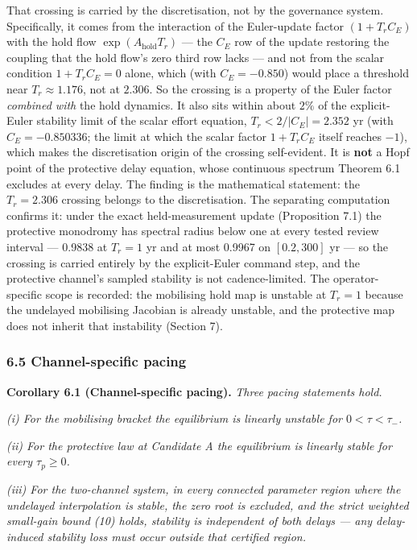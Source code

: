 \documentclass[11pt]{article}
\begin{document}
That crossing is carried by the discretisation, not by the governance
system. Specifically, it comes from the interaction of the Euler-update
factor \((1 + T_r C_E)\) with the hold flow
\(\exp(A_{\mathrm{hold}}T_r)\) --- the \(C_E\) row of the update
restoring the coupling that the hold flow's zero third row lacks --- and
not from the scalar condition \(1 + T_r C_E = 0\) alone, which (with
\(C_E = -0.850\)) would place a threshold near \(T_r \approx 1.176\),
not at \(2.306\). So the crossing is a property of the Euler factor
\emph{combined with} the hold dynamics. It also sits within about
\(2\%\) of the explicit-Euler stability limit of the scalar effort
equation, \(T_r < 2/|C_E| = 2.352\) yr (with \(C_E = -0.850336\); the
limit at which the scalar factor \(1 + T_r C_E\) itself reaches \(-1\)),
which makes the discretisation origin of the crossing self-evident. It
is \textbf{not} a Hopf point of the protective delay equation, whose
continuous spectrum Theorem 6.1 excludes at every delay. The finding is
the mathematical statement: the \(T_r = 2.306\) crossing belongs to the
discretisation. The separating computation confirms it: under the exact
held-measurement update (Proposition 7.1) the protective monodromy has
spectral radius below one at every tested review interval --- 0.9838 at
\(T_r = 1\) yr and at most 0.9967 on \([0.2, 300]\) yr --- so the
crossing is carried entirely by the explicit-Euler command step, and the
protective channel's sampled stability is not cadence-limited. The
operator-specific scope is recorded: the mobilising hold map is unstable
at \(T_r = 1\) because the undelayed mobilising Jacobian is already
unstable, and the protective map does not inherit that instability
(Section 7).

\subsubsection{6.5 Channel-specific
pacing}\label{channel-specific-pacing}

\textbf{Corollary 6.1 (Channel-specific pacing).} \emph{Three pacing
statements hold.}

\emph{(i) For the mobilising bracket the equilibrium is linearly
unstable for \(0 < \tau < \tau_-\).}

\emph{(ii) For the protective law at Candidate A the equilibrium is
linearly stable for every \(\tau_p \ge 0\).}

\emph{(iii) For the two-channel system, in every connected parameter
region where the undelayed interpolation is stable, the zero root is
excluded, and the strict weighted small-gain bound (10) holds, stability
is independent of both delays --- any delay-induced stability loss must
occur outside that certified region.}
\end{document}
